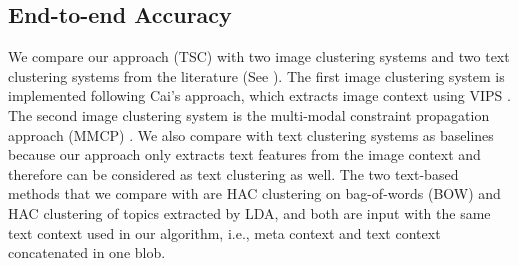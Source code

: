 

\subsection{End-to-end Accuracy}
\label{sec:end2end}
We compare our approach (TSC) with
two image clustering systems and two text clustering systems from
the literature (See ).
The first image clustering system is implemented following
Cai's \cite{Cai2004} approach, which extracts image context
using VIPS \cite{VIPS}.
The second image clustering system is the multi-modal
constraint propagation approach (MMCP) \cite{Fu2011}.
We also compare with text clustering systems as baselines because
our approach only extracts text features from the image
context and therefore can be considered as text clustering as well.
The two text-based methods that we compare with are HAC clustering
on bag-of-words (BOW) and HAC clustering of topics extracted by
LDA\cite{Blei2003},
and both are input with the same text context used in our algorithm,
i.e., meta context and text context concatenated in one blob.

